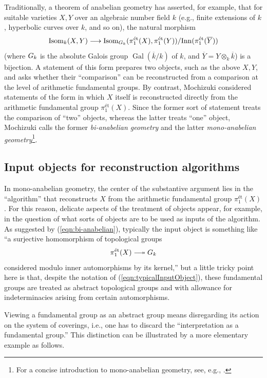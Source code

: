 \documentclass[12pt, reqno, a4paper]{amsart}
\def\ovl#1{\overline{#1}} %
\def\longto{\longrightarrow}
\def\surjlongto{\relbar\joinrel\twoheadrightarrow}
\def\et{\textrm{\'et}}
\DeclareMathOperator{\Gal}{Gal}
\begin{document}
Traditionally, a theorem of anabelian geometry has asserted, for example, that for suitable varieties $X,Y$ over an algebraic number field $k$ (e.g., finite extensions of $k$, hyperbolic curves over $k$, and so on), the natural morphism
\begin{equation}\label{eqn:bi-anabelian}
\mathrm{Isom}_k(X,Y)\longto\mathrm{Isom}_{\GG_k}(\pi^{\et}_1(X),\pi^{\et}_1(Y))/\mathrm{Inn}(\pi^{\et}_1(\ovl{Y}))
\end{equation}
(where $\GG_k$ is the absolute Galois group $\Gal(\ovl{k}/k)$ of $k$, and $\ovl{Y}=Y\otimes_k\ovl{k}$) is a bijection.
A statement of this form prepares two objects, such as the above $X,Y$, and asks whether their ``comparison'' can be reconstructed from a comparison at the level of arithmetic fundamental groups.
By contrast, Mochizuki considered statements of the form in which $X$ itself is reconstructed directly from the arithmetic fundamental group $\pi^{\et}_1(X)$.
Since the former sort of statement treats the comparison of ``two'' objects, whereas the latter treats ``one'' object, Mochizuki calls the former {\it bi-anabelian geometry} and the latter {\it mono-anabelian geometry}\footnote{For a concise introduction to  mono-anabelian geometry, see, e.g., \cite{MR4491969}.}.

\subsection{Input objects for reconstruction algorithms}\label{sub:inputObjects}
In mono-anabelian geometry, the center of the substantive argument lies in the ``algorithm'' that reconstructs $X$ from the arithmetic fundamental group $\pi^{\et}_1(X)$.
For this reason, delicate aspects of the treatment of objects appear, for example, in the question of what sorts of objects are to be used as inputs of the algorithm.
As suggested by (\ref{eqn:bi-anabelian}), typically the input object is something like ``a surjective homomorphism of topological groups
\begin{equation}\label{eqn:typicalInputObject}
\pi^{\et}_1(X)\surjlongto \GG_k
\end{equation}
considered modulo inner automorphisms by its kernel,'' but a little tricky point here is that, despite the notation of (\ref{eqn:typicalInputObject}), these fundamental groups are treated as abstract topological groups and with allowance for indeterminacies arising from certain automorphisms.

Viewing a fundamental group as an abstract group means disregarding its action on the system of coverings, i.e., one has to discard the ``interpretation as a fundamental group.''
This distinction can be illustrated by a more elementary example as follows.
\end{document}
